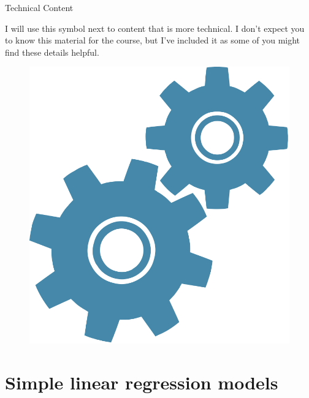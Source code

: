 \documentclass[10pt,t]{beamer}
\begin{document}
\begin{frame}{Technical Content}
	
I will use this symbol next to content that is more technical. I don't expect you to know this material for the course, but I've included it as some of you might find these details helpful.
\smallskip
\begin{figure}
	\centering
	\includegraphics[scale=0.15]{technical}
\end{figure}

\end{frame}


\section{Simple linear regression models}
\end{document}
